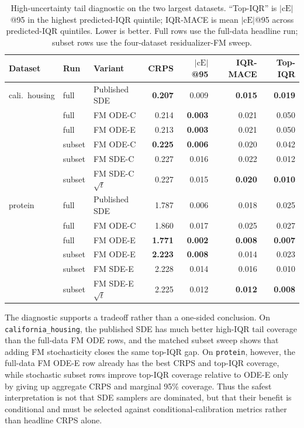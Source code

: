 \documentclass{uai2026}
\begin{document}
\begin{table}[!h]
  \centering
  \caption{High-uncertainty tail diagnostic on the two largest datasets. ``Top-IQR'' is $|\text{cE}|$@95 in the highest predicted-IQR quintile; IQR-MACE is mean $|\text{cE}|$@95 across predicted-IQR quintiles. Lower is better. Full rows use the full-data headline run; subset rows use the four-dataset residualizer-FM sweep.}\label{tab:tail-diagnostic}
  \scriptsize
  \begin{tabular}{lllrrrr}
    \toprule
    Dataset & Run & Variant & CRPS & $|\text{cE}|$@95 & IQR-MACE & Top-IQR \\
    \midrule
    cali.\ housing & full & Published SDE & \textbf{0.207} & 0.009 & \textbf{0.015} & \textbf{0.019} \\
                  & full & FM ODE-C      & 0.214 & \textbf{0.003} & 0.021 & 0.050 \\
                  & full & FM ODE-E      & 0.213 & \textbf{0.003} & 0.021 & 0.050 \\
                  & subset & FM ODE-C    & \textbf{0.225} & \textbf{0.006} & 0.020 & 0.042 \\
                  & subset & FM SDE-C    & 0.227 & 0.016 & 0.022 & 0.012 \\
                  & subset & FM SDE-C $\sqrt{t}$ & 0.227 & 0.015 & \textbf{0.020} & \textbf{0.010} \\
    protein       & full & Published SDE & 1.787 & 0.006 & 0.018 & 0.025 \\
                  & full & FM ODE-C      & 1.860 & 0.017 & 0.025 & 0.027 \\
                  & full & FM ODE-E      & \textbf{1.771} & \textbf{0.002} & \textbf{0.008} & \textbf{0.007} \\
                  & subset & FM ODE-E    & \textbf{2.223} & \textbf{0.008} & 0.014 & 0.023 \\
                  & subset & FM SDE-E    & 2.228 & 0.014 & 0.016 & 0.010 \\
                  & subset & FM SDE-E $\sqrt{t}$ & 2.225 & 0.012 & \textbf{0.012} & \textbf{0.008} \\
    \bottomrule
  \end{tabular}
\end{table}

The diagnostic supports a tradeoff rather than a one-sided conclusion. On \texttt{california\_housing}, the published SDE has much better high-IQR tail coverage than the full-data FM ODE rows, and the matched subset sweep shows that adding FM stochasticity closes the same top-IQR gap. On \texttt{protein}, however, the full-data FM ODE-E row already has the best CRPS and top-IQR coverage, while stochastic subset rows improve top-IQR coverage relative to ODE-E only by giving up aggregate CRPS and marginal 95\% coverage. Thus the safest interpretation is not that SDE samplers are dominated, but that their benefit is conditional and must be selected against conditional-calibration metrics rather than headline CRPS alone.
\end{document}
